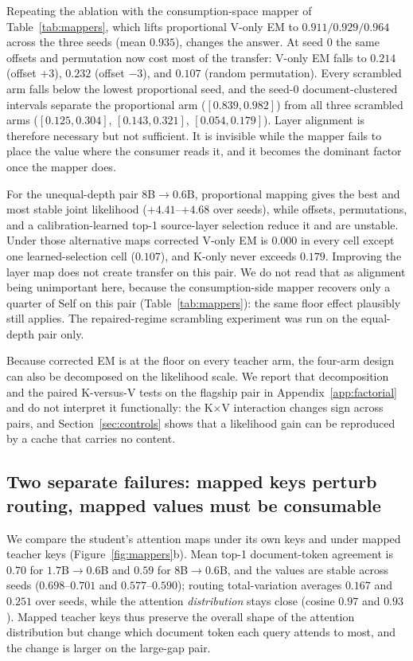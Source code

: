 \documentclass[11pt]{article}
\begin{document}
Repeating the ablation with the consumption-space mapper of
Table~\ref{tab:mappers}, which lifts proportional V-only EM to $0.911/0.929/0.964$
across the three seeds (mean $0.935$), changes the answer. At seed 0 the same
offsets and permutation now cost most of the transfer: V-only EM falls to $0.214$
(offset $+3$), $0.232$ (offset $-3$), and $0.107$ (random permutation). Every
scrambled arm falls below the lowest proportional seed, and the seed-0
document-clustered intervals separate the proportional arm ($[0.839, 0.982]$)
from all three scrambled arms ($[0.125, 0.304]$, $[0.143, 0.321]$,
$[0.054, 0.179]$). Layer alignment is therefore necessary but not sufficient. It
is invisible while the mapper fails to place the value where the consumer reads
it, and it becomes the dominant factor once the mapper does.

For the unequal-depth pair $8$B$\to0.6$B, proportional mapping gives the best and
most stable joint likelihood ($+4.41$--$+4.68$ over seeds), while offsets,
permutations, and a calibration-learned top-1 source-layer selection reduce it and
are unstable. Under those alternative maps corrected V-only EM is $0.000$ in
every cell except one learned-selection cell ($0.107$), and K-only never
exceeds $0.179$. Improving the layer map does not create transfer on this
pair. We do not read that as alignment being unimportant here, because the
consumption-side mapper recovers only a quarter of Self on this pair
(Table~\ref{tab:mappers}): the same floor effect plausibly still applies. The
repaired-regime scrambling experiment was run on the equal-depth pair only.

Because corrected EM is at the floor on every teacher arm, the four-arm design
can also be decomposed on the likelihood scale. We report that decomposition and
the paired K-versus-V tests on the flagship pair in
Appendix~\ref{app:factorial} and do not interpret it functionally: the
K$\times$V interaction changes sign across pairs, and
Section~\ref{sec:controls} shows that a likelihood gain can be reproduced by a
cache that carries no content.

\subsection{Two separate failures: mapped keys perturb routing, mapped values must be consumable}
\label{sec:two-failures}
We compare the student's attention maps under its own keys and under mapped
teacher keys (Figure~\ref{fig:mappers}b). Mean top-1 document-token agreement is
$0.70$ for $1.7$B$\to0.6$B and $0.59$ for $8$B$\to0.6$B, and the values are
stable across seeds ($0.698$--$0.701$ and $0.577$--$0.590$); routing
total-variation averages $0.167$ and $0.251$ over seeds, while the attention
\emph{distribution} stays close (cosine $0.97$ and $0.93$). Mapped teacher keys
thus preserve the overall shape of the attention distribution but change which
document token each query attends to most, and the change is larger on the
large-gap pair.
\end{document}
